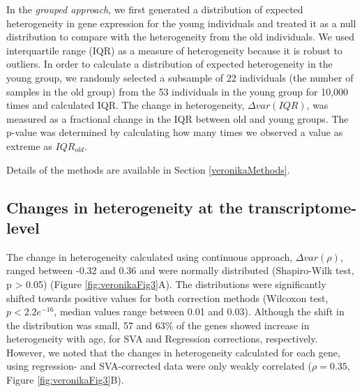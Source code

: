 \documentclass[12pt,twoside]{unicam}
\begin{document}
In the \emph{grouped approach}, we first generated a distribution of expected heterogeneity in gene expression for the young individuals and treated it as a null distribution to compare with the heterogeneity from the old individuals. We used interquartile range (IQR) as a measure of heterogeneity because it is robust to outliers. In order to calculate a distribution of expected heterogeneity in the young group, we randomly selected a subsample of 22 individuals (the number of samples in the old group) from the 53 individuals in the young group for 10,000 times and calculated IQR. The change in heterogeneity, \(\Delta var(IQR)\), was measured as a fractional change in the IQR between old and young groups. The p-value was determined by calculating how many times we observed a value as extreme as \(IQR_{old}\).

Details of the methods are available in Section \ref{veronikaMethods}.

\hypertarget{changes-in-heterogeneity-at-the-transcriptome-level}{%
\subsection{Changes in heterogeneity at the transcriptome-level}\label{changes-in-heterogeneity-at-the-transcriptome-level}}

The change in heterogeneity calculated using continuous approach, \(\Delta var (\rho)\), ranged between -0.32 and 0.36 and were normally distributed (Shapiro-Wilk test, p \textgreater{} 0.05) (Figure \ref{fig:veronikaFig3}A). The distributions were significantly shifted towards positive values for both correction methods (Wilcoxon test, \(p<2.2e^{-16}\), median values range between 0.01 and 0.03). Although the shift in the distribution was small, 57 and 63\% of the genes showed increase in heterogeneity with age, for SVA and Regression corrections, respectively. However, we noted that the changes in heterogeneity calculated for each gene, using regression- and SVA-corrected data were only weakly correlated (\(\rho = 0.35\), Figure \ref{fig:veronikaFig3}B).
\end{document}
